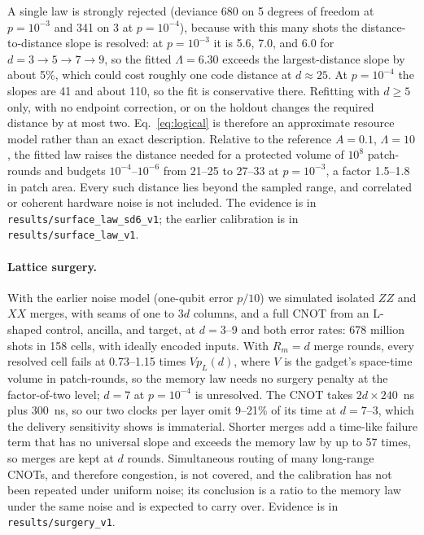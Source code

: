 \documentclass[11pt]{article}
\begin{document}
A single law is strongly rejected (deviance 680 on 5 degrees of freedom at
$p=10^{-3}$ and 341 on 3 at $p=10^{-4}$), because with this many shots the
distance-to-distance slope is resolved: at $p=10^{-3}$ it is 5.6, 7.0, and 6.0 for
$d=3\to5\to7\to9$, so the fitted $\Lambda=6.30$ exceeds the largest-distance slope by
about 5\%, which could cost roughly one code distance at $d\approx25$. At
$p=10^{-4}$ the slopes are 41 and about 110, so the fit is conservative there.
Refitting with $d\geq5$ only, with no endpoint correction, or on the holdout changes
the required distance by at most two. Eq.~\eqref{eq:logical} is therefore an
approximate resource model rather than an exact description. Relative to the
reference $A=0.1$, $\Lambda=10$, the fitted law raises the distance needed for a
protected volume of $10^8$ patch-rounds and budgets $10^{-4}$--$10^{-6}$ from 21--25 to
27--33 at $p=10^{-3}$, a factor 1.5--1.8 in patch area. Every such distance lies
beyond the sampled range, and correlated or coherent hardware noise is not
included. The evidence is in \texttt{results/surface\_law\_sd6\_v1}; the earlier
calibration is in \texttt{results/surface\_law\_v1}.

\paragraph{Lattice surgery.} With the earlier noise model (one-qubit error $p/10$)
we simulated isolated
$ZZ$ and $XX$ merges, with seams of one to $3d$ columns, and a full CNOT from an
L-shaped control, ancilla, and target, at $d=3$--9 and both error rates: 678
million shots in 158 cells, with ideally encoded inputs. With $R_m=d$ merge
rounds, every resolved cell fails at 0.73--1.15 times $Vp_L(d)$, where $V$ is
the gadget's space-time volume in patch-rounds, so the memory law needs no
surgery penalty at the factor-of-two level; $d=7$ at $p=10^{-4}$ is unresolved.
The CNOT takes $2d\times240$~ns plus 300~ns, so our two clocks per layer omit
9--21\% of its time at $d=7$--3, which the delivery sensitivity shows is
immaterial. Shorter merges add a time-like failure term that has no universal
slope and exceeds the memory law by up to 57 times, so merges are kept at $d$
rounds. Simultaneous routing of many long-range CNOTs, and therefore
congestion, is not covered, and the calibration has not been repeated under
uniform noise; its conclusion is a ratio to the memory law under the same noise
and is expected to carry over. Evidence is in \texttt{results/surgery\_v1}.
\end{document}

